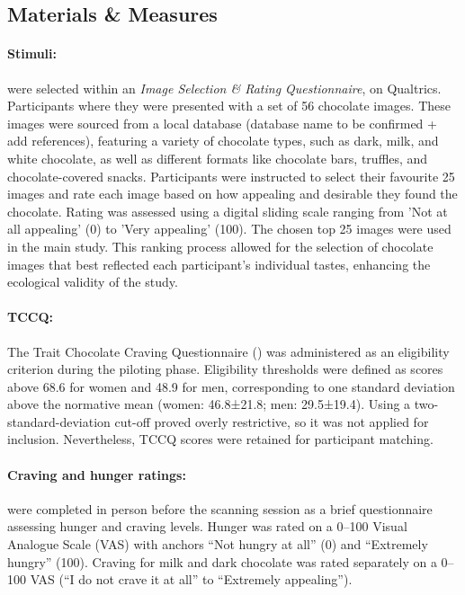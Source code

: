 \documentclass[]{imag-ms-template}
\begin{document}
\subsection{Materials \& Measures}

\paragraph{Stimuli:} were selected within an \textit{Image Selection \& Rating Questionnaire}, on Qualtrics. Participants where they were presented with a set of 56 chocolate images. These images were sourced from a local database (database name to be confirmed + add references), featuring a variety of chocolate types, such as dark, milk, and white chocolate, as well as different formats like chocolate bars, truffles, and chocolate-covered snacks. Participants were instructed to select their favourite 25 images and rate each image based on how appealing and desirable they found the chocolate. Rating was assessed using a digital sliding scale ranging from 'Not at all appealing' (0) to 'Very appealing' (100). The chosen top 25 images were used in the main study. This ranking process allowed for the selection of chocolate images that best reflected each participant’s individual tastes, enhancing the ecological validity of the study.

\paragraph*{TCCQ:} The Trait Chocolate Craving Questionnaire (\cite{bentonDevelopmentAttitudesChocolate1998}) was administered as an eligibility criterion during the piloting phase. Eligibility thresholds were defined as scores above 68.6 for women and 48.9 for men, corresponding to one standard deviation above the normative mean (women: 46.8±21.8; men: 29.5±19.4). Using a two-standard-deviation cut-off proved overly restrictive, so it was not applied for inclusion. Nevertheless, TCCQ scores were retained for participant matching.

\paragraph{Craving and hunger ratings:} were completed in person before the scanning session as a brief questionnaire assessing hunger and craving levels. Hunger was rated on a 0–100 Visual Analogue Scale (VAS) with anchors “Not hungry at all” (0) and “Extremely hungry” (100). Craving for milk and dark chocolate was rated separately on a 0–100 VAS (“I do not crave it at all” to “Extremely appealing”).
\end{document}
